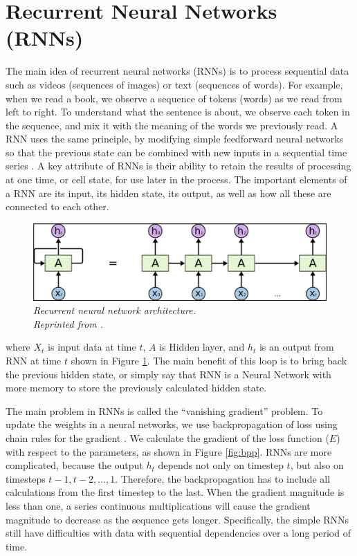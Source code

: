 \section{Recurrent Neural Networks (RNNs)}

The main idea of recurrent neural networks (RNNs) is to process sequential data such as videos (sequences of images) or text (sequences of words). For example, when we read a book, we observe a sequence of tokens (words) as we read from left to right. To understand what the sentence is about, we observe each token in the sequence, and mix it with the meaning of the words we previously read. A RNN uses the same principle, by modifying simple feedforward neural networks so that the previous state can be combined with new inputs in a sequential time series \cite{donges_2019}. A key attribute of RNNs is their ability to retain the results of processing at one time, or cell state, for use later in the process. The important elements of a RNN are its input, its hidden state, its output, as well as how all these are connected to each other.


\begin{figure}[H]
  \centering
  \caption[Recurrent neural network architecture.]{\emph{Recurrent neural network architecture. \\
      Reprinted from \citeauthor{olah_2015} \citeyear{olah_2015}.}}\label{fig:RNN}
  \includegraphics[scale = 0.2]{figures/RNN.jpg}
\end{figure}


where $X_t$ is input data at time $t$, $A$ is Hidden layer, and $h_t$ is an output from RNN at time $t$ shown in Figure \ref{fig:RNN}. The main benefit of this loop is to bring back the previous hidden state, or simply say that RNN is a Neural Network with more memory to store the previously calculated hidden state.


The main problem in RNNs is called the ``vanishing gradient'' problem. To update the weights in a neural networks, we use backpropagation of loss using chain rules for the gradient \cite{arnx_2019}. We calculate the gradient of the loss function ($E$) with respect to the parameters, as shown in Figure \ref{fig:bpp}. RNNs are more complicated, because the output $h_t$ depends not only on timestep $t$, but also on timesteps $t-1, t-2, ..., 1$. Therefore, the backpropagation has to include all calculations from the first timestep to the last. When the gradient magnitude is less than one, a series continuous multiplications will cause the gradient magnitude to decrease as the sequence gets longer. Specifically, the simple RNNs still have difficulties with data with sequential dependencies over a long period of time.

